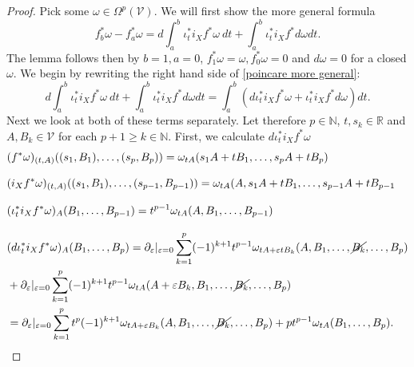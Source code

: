\documentclass[b5paper,draft,openbib,12pt]{memoir}
\begin{document}
\begin{proof}
Pick some \(\omega \in \Omega^p(\mathcal{V})\).
We will first show the more general formula 
\begin{equation}\label{poincare more general}
f^*_b\omega-f^*_a \omega=d \int_{a}^b \iota_t^* i_X f^* \omega ~dt+ \int_{a}^b \iota_t^* i_X f^* d \omega dt.
\end{equation}
The lemma follows then by \(b=1, a= 0\), \(f^*_1\omega=\omega, f^*_0 \omega=0\) and \(d \omega=0\) for a closed \(\omega\). 
We begin by rewriting the right hand side of \eqref{poincare more general}:
\begin{equation}\label{poincare 1 manipulation}
d \int_{a}^b \iota_t^* i_X f^* \omega ~dt+ \int_{a}^b \iota_t^* i_X f^* d \omega dt=
\int_a^b (d\iota_t^* i_X f^* \omega+ \iota_t^* i_X f^* d \omega )dt.
\end{equation}
Next we look at both of these terms separately. Let therefore \(p\in \mathbb{N}\), \(t, s_k\in \mathbb{R}\) and \(A,B_k\in \mathcal{V}\) for each \(p+1\ge k\in\mathbb{N}\).
First, we calculate \(d \iota^*_t i_X f^* \omega\)
\begin{align}
&(f^*\omega)_{(t,A)}((s_1,B_1),\dots, (s_p,B_p))=\omega_{tA}(s_1A+tB_1,\dots, s_p A+t B_p)\\[0.3cm]
&(i_X f^* \omega)_{(t,A)}((s_1,B_1),\dots, (s_{p-1},B_{p-1}))=\omega_{tA}(A,s_1A+tB_1,\dots, s_{p-1}A + t B_{p-1}\\[0.3cm]
&(\iota^*_t i_X f^* \omega)_{A}(B_1,\dots, B_{p-1})= t^{p-1} \omega_{t A}(A,B_1,\dots, B_{p-1})\\[0.3cm]\notag
&(d\iota^*_t i_X f^* \omega)_{A}(B_1,\dots, B_{p})=\partial_\varepsilon |_{\varepsilon=0} \sum_{k=1}^p (-1)^{k+1} t^{p-1} \omega_{t A + \varepsilon t B_k}(A,B_1,\dots, \cancel{B_k},\dots, B_p)\\
&+ \partial_\varepsilon|_{\varepsilon=0} \sum_{k=1}^p (-1)^{k+1} t^{p-1} \omega_{tA}(A+\varepsilon B_k,B_1,\dots, \cancel{B_k},\dots, B_p)\\\label{li derivative 1}
&=\partial_{\varepsilon}|_{\varepsilon=0}\sum_{k=1}^p t^p (-1)^{k+1} \omega_{tA+\varepsilon B_k}(A,B_1,\dots, \cancel{B_k},\dots, B_p)+p t^{p-1}\omega_{tA}(B_1,\dots, B_p).
\end{align}



\end{proof}
\end{document}
